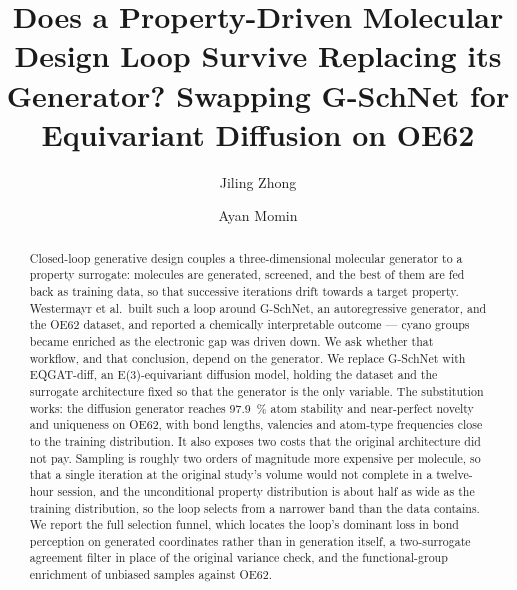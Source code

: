 \documentclass[runningheads]{llncs}
\begin{document}
\title{Does a Property-Driven Molecular Design Loop Survive Replacing
       its Generator? Swapping G-SchNet for Equivariant Diffusion on
       OE62}

\author{Jiling Zhong \and Ayan Momin}


\maketitle

\begin{abstract}
Closed-loop generative design couples a three-dimensional molecular
generator to a property surrogate: molecules are generated, screened,
and the best of them are fed back as training data, so that successive
iterations drift towards a target property. Westermayr et al.\ built
such a loop around G-SchNet, an autoregressive generator, and the OE62
dataset, and reported a chemically interpretable outcome --- cyano
groups became enriched as the electronic gap was driven down. We ask
whether that workflow, and that conclusion, depend on the generator. We
replace G-SchNet with EQGAT-diff, an E(3)-equivariant diffusion model,
holding the dataset and the surrogate architecture fixed so that the
generator is the only variable. The substitution works: the diffusion
generator reaches \SI{97.9}{\percent} atom stability and near-perfect
novelty and uniqueness on OE62, with bond lengths, valencies and
atom-type frequencies close to the training distribution. It also
exposes two costs that the original architecture did not pay. Sampling
is roughly two orders of magnitude more expensive per molecule, so that
a single iteration at the original study's volume would not complete in
a twelve-hour session, and the unconditional property distribution is
about half as wide as the training distribution, so the loop selects
from a narrower band than the data contains. We report the full
selection funnel, which locates the loop's dominant loss in bond
perception on generated coordinates rather than in generation itself, a
two-surrogate agreement filter in place of the original variance check,
and the functional-group enrichment of unbiased samples against OE62.

\end{abstract}
\end{document}
